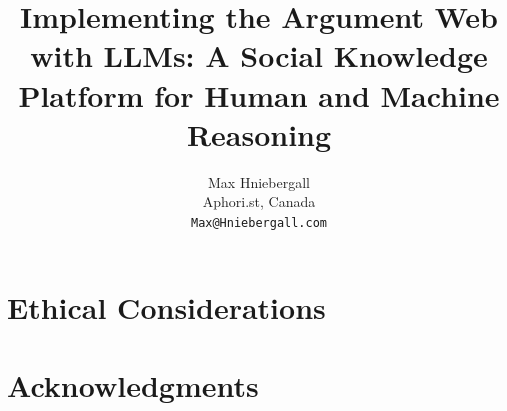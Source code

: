 \documentclass[11pt]{article}
\title{Implementing the Argument Web with LLMs: A Social Knowledge Platform for Human and Machine Reasoning}
\author{Max Hniebergall \\
  Aphori.st, Canada\\
  \texttt{Max@Hniebergall.com} }
\begin{document}
\maketitle

\begin{abstract}

\end{abstract}











\section*{Ethical Considerations}


\section*{Acknowledgments}




\appendix

\end{document}
